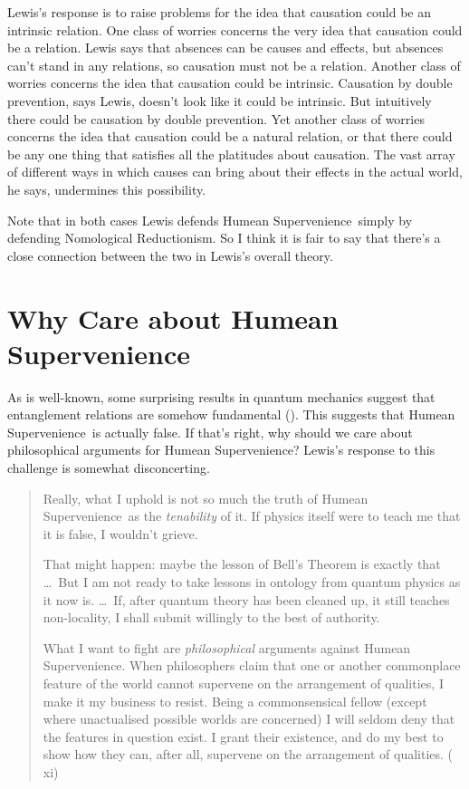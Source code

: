 \documentclass[
  10pt,
  letterpaper,
  DIV=11,
  numbers=noendperiod,
  twoside]{scrartcl}
\begin{document}
Lewis's response is to raise problems for the idea that causation could
be an intrinsic relation. One class of worries concerns the very idea
that causation could be a relation. Lewis says that absences can be
causes and effects, but absences can't stand in any relations, so
causation must not be a relation. Another class of worries concerns the
idea that causation could be intrinsic. Causation by double prevention,
says Lewis, doesn't look like it could be intrinsic. But intuitively
there could be causation by double prevention. Yet another class of
worries concerns the idea that causation could be a natural relation, or
that there could be any one thing that satisfies all the platitudes
about causation. The vast array of different ways in which causes can
bring about their effects in the actual world, he says, undermines this
possibility.

Note that in both cases Lewis defends Humean Supervenience~simply by
defending Nomological Reductionism. So I think it is fair to say that
there's a close connection between the two in Lewis's overall theory.

\section{Why Care about Humean
Supervenience}\label{why-care-about-humean-supervenience}

As is well-known, some surprising results in quantum mechanics suggest
that entanglement relations are somehow fundamental
(). This suggests that Humean
Supervenience~is actually false. If that's right, why should we care
about philosophical arguments for Humean Supervenience? Lewis's response
to this challenge is somewhat disconcerting.

\begin{quote}
Really, what I uphold is not so much the truth of Humean
Supervenience~as the \emph{tenability} of it. If physics itself were to
teach me that it is false, I wouldn't grieve.

That might happen: maybe the lesson of Bell's Theorem is exactly that
\ldots~But I am not ready to take lessons in ontology from quantum
physics as it now is. \ldots~If, after quantum theory has been cleaned
up, it still teaches non-locality, I shall submit willingly to the best
of authority.

What I want to fight are \emph{philosophical} arguments against Humean
Supervenience. When philosophers claim that one or another commonplace
feature of the world cannot supervene on the arrangement of qualities, I
make it my business to resist. Being a commonsensical fellow (except
where unactualised possible worlds are concerned) I will seldom deny
that the features in question exist. I grant their existence, and do my
best to show how they can, after all, supervene on the arrangement of
qualities. ( xi)
\end{quote}
\end{document}
